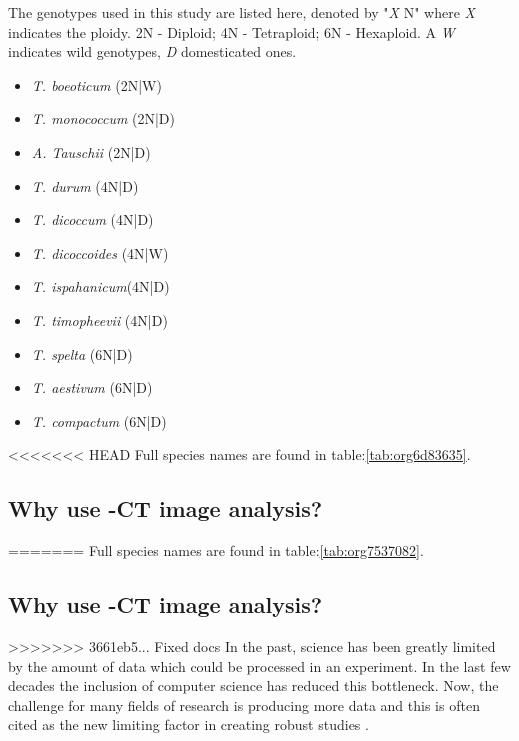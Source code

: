 \documentclass[11pt]{report}
\begin{document}
The genotypes used in this study are listed here, denoted by "\emph{X} N" where \emph{X} indicates the ploidy. 2N - Diploid; 4N - Tetraploid; 6N - Hexaploid. A \emph{W} indicates wild genotypes, \emph{D} domesticated ones.

\begin{multicols}{3}

  \begin{itemize}
  \item{\textit{T. boeoticum} (2N|W)}
  \item{\textit{T. monococcum} (2N|D)}
  \item{\textit{A. Tauschii} (2N|D)}
  \end{itemize}

  \columnbreak

  \begin{itemize}
  \item{\textit{T. durum} (4N|D)}
  \item{\textit{T. dicoccum} (4N|D)}
  \item{\textit{T. dicoccoides} (4N|W)}
  \item{\textit{T. ispahanicum}(4N|D)}
  \item{\textit{T. timopheevii} (4N|D)}
  \end{itemize}

  \columnbreak

  \begin{itemize}
  \item{\textit{T. spelta} (6N|D)}
  \item{\textit{T. aestivum} (6N|D)}
  \item{\textit{T. compactum} (6N|D)}
  \end{itemize}

\end{multicols}
<<<<<<< HEAD
Full species names are found in table:\ref{tab:org6d83635}.

\subsection{Why use \textmu{}-CT image analysis?}
\label{sec:org8cd90d4}
=======
Full species names are found in table:\ref{tab:org7537082}.

\subsection{Why use \textmu{}-CT image analysis?}
\label{sec:orgd4da4d3}
>>>>>>> 3661eb5... Fixed docs
In the past, science has been greatly limited by the amount of data which could be processed in an experiment. In the last few decades the inclusion of computer science has reduced this bottleneck. Now, the challenge for many fields of research is producing more data and this is often cited as the new limiting factor in creating robust studies \cite{Furbank2011}.
\end{document}
